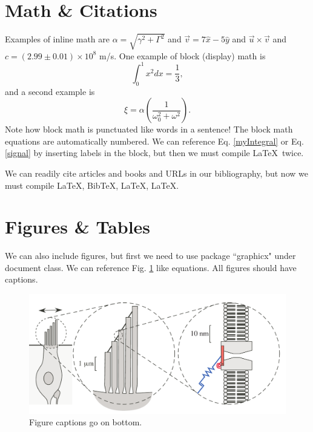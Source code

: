 \documentclass{book}
\begin{document}
\section{Math \& Citations}	%
Examples of inline math are $\alpha = \sqrt{\gamma^2 + \Gamma^2}$ and $\vec{v} = 7 \hat{x} - 5 \hat{y}$ and $\vec u \times \vec v$ and $c = (2.99 \pm 0.01) \times 10^8$ m/s. One example of block (display) math is
%
\begin{equation}
	\int_0^1x^2 dx = \frac{1}{3},
	\label{myIntegral}
\end{equation}
%
and a second example is
%
\begin{equation}
	\xi = \alpha \left( \frac{1}{ \omega_0^2 + \omega^2 } \right).
	\label{signal}
\end{equation}
%
Note how block math is punctuated like words in a sentence! The block math equations are automatically numbered. We can reference Eq. \ref{myIntegral} or Eq. \ref{signal} by inserting labels in the block, but then we must compile \LaTeX\ twice.

We can readily cite articles \cite{Chenciner2000}  and books \cite{Gleick1987} and URLs \cite{Lindner2015} in our bibliography, but now we must compile \LaTeX, Bib\TeX,  \LaTeX, \LaTeX.

\section{Figures \& Tables}
We can also include figures, but first we need to use package ``graphicx" under document class. We can reference Fig. \ref{SchematicDiagram} like equations. All figures should have captions.

\begin{figure}[ht] %
	\begin{center}
		\includegraphics[width=0.8\linewidth]{Figures/ExampleFigure} %
		\caption{Figure captions go on bottom.}
		\label{SchematicDiagram}
	\end{center}
\end{figure}
\end{document}
